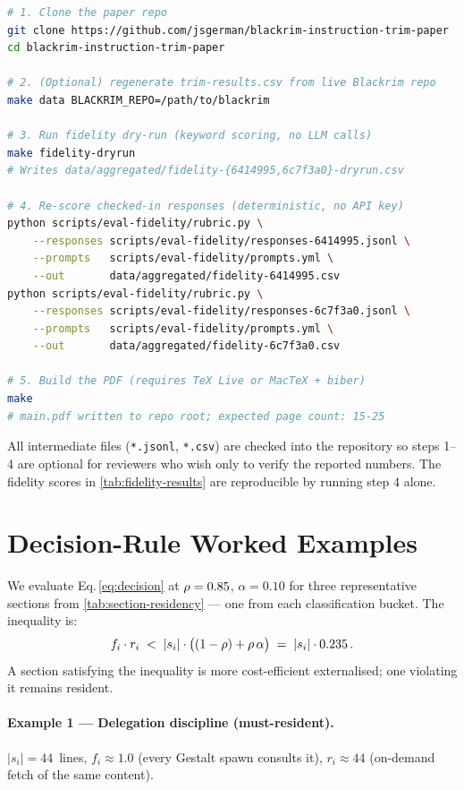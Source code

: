 \begin{lstlisting}[language=bash,caption={Shell transcript: clean clone to built PDF.},label=lst:repro]
# 1. Clone the paper repo
git clone https://github.com/jsgerman/blackrim-instruction-trim-paper
cd blackrim-instruction-trim-paper

# 2. (Optional) regenerate trim-results.csv from live Blackrim repo
make data BLACKRIM_REPO=/path/to/blackrim

# 3. Run fidelity dry-run (keyword scoring, no LLM calls)
make fidelity-dryrun
# Writes data/aggregated/fidelity-{6414995,6c7f3a0}-dryrun.csv

# 4. Re-score checked-in responses (deterministic, no API key)
python scripts/eval-fidelity/rubric.py \
    --responses scripts/eval-fidelity/responses-6414995.jsonl \
    --prompts   scripts/eval-fidelity/prompts.yml \
    --out       data/aggregated/fidelity-6414995.csv
python scripts/eval-fidelity/rubric.py \
    --responses scripts/eval-fidelity/responses-6c7f3a0.jsonl \
    --prompts   scripts/eval-fidelity/prompts.yml \
    --out       data/aggregated/fidelity-6c7f3a0.csv

# 5. Build the PDF (requires TeX Live or MacTeX + biber)
make
# main.pdf written to repo root; expected page count: 15-25
\end{lstlisting}

\noindent
All intermediate files (\texttt{*.jsonl}, \texttt{*.csv}) are checked into
the repository so steps 1--4 are optional for reviewers who wish only to
verify the reported numbers. The fidelity scores in \cref{tab:fidelity-results}
are reproducible by running step 4 alone.

\section{Decision-Rule Worked Examples}
\label{sec:appendix-worked}

We evaluate Eq.\,\eqref{eq:decision} at $\rho = 0.85$,
$\alpha = 0.10$ for three representative sections from
\cref{tab:section-residency} --- one from each classification bucket.
The inequality is:
\[
  f_i \cdot r_i \;<\; |s_i| \cdot \bigl((1 - \rho) + \rho\,\alpha\bigr)
                  \;=\; |s_i| \cdot 0.235 \,.
\]
A section satisfying the inequality is more cost-efficient externalised;
one violating it remains resident.

\paragraph{Example 1 — Delegation discipline (must-resident).}
$|s_i| = 44$~lines, $f_i \approx 1.0$ (every Gestalt spawn consults it),
$r_i \approx 44$ (on-demand fetch of the same content).

